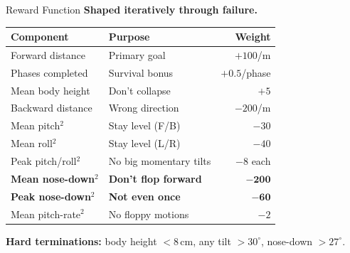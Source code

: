 \documentclass[aspectratio=169]{beamer}
\begin{document}
\begin{frame}{Reward Function}
\textbf{Shaped iteratively through failure.}

\vspace{0.3em}
\small
\begin{tabular}{llr}
    \toprule
    Component & Purpose & Weight \\
    \midrule
    Forward distance        & Primary goal          & $+100$/m \\
    Phases completed        & Survival bonus        & $+0.5$/phase \\
    Mean body height        & Don't collapse        & $+5$ \\
    Backward distance       & Wrong direction       & $-200$/m \\
    Mean pitch$^2$          & Stay level (F/B)      & $-30$ \\
    Mean roll$^2$           & Stay level (L/R)      & $-40$ \\
    Peak pitch/roll$^2$     & No big momentary tilts & $-8$ each \\
    \textbf{Mean nose-down}$^2$ & \textbf{Don't flop forward} & $\mathbf{-200}$ \\
    \textbf{Peak nose-down}$^2$ & \textbf{Not even once}      & $\mathbf{-60}$ \\
    Mean pitch-rate$^2$     & No floppy motions     & $-2$ \\
    \bottomrule
\end{tabular}
\normalsize

\vspace{0.3em}
\textbf{Hard terminations:} body height $<8$\,cm, any tilt $>30^\circ$, nose-down $>27^\circ$.
\end{frame}
\end{document}
